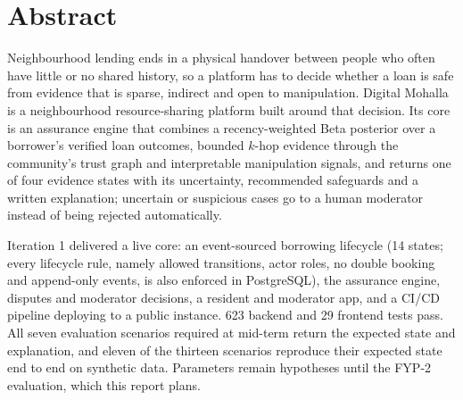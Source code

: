 \chapter*{Abstract}
Neighbourhood lending ends in a physical handover between people who often have little or no shared history, so a platform has to decide whether a loan is safe from evidence that is sparse, indirect and open to manipulation. Digital Mohalla is a neighbourhood resource-sharing platform built around that decision. Its core is an assurance engine that combines a recency-weighted Beta posterior over a borrower's verified loan outcomes, bounded $k$-hop evidence through the community's trust graph and interpretable manipulation signals, and returns one of four evidence states with its uncertainty, recommended safeguards and a written explanation; uncertain or suspicious cases go to a human moderator instead of being rejected automatically.

Iteration 1 delivered a live core: an event-sourced borrowing lifecycle (14 states; every lifecycle rule, namely allowed transitions, actor roles, no double booking and append-only events, is also enforced in PostgreSQL), the assurance engine, disputes and moderator decisions, a resident and moderator app, and a CI/CD pipeline deploying to a public instance. 623 backend and 29 frontend tests pass. All seven evaluation scenarios required at mid-term return the expected state and explanation, and eleven of the thirteen scenarios reproduce their expected state end to end on synthetic data. Parameters remain hypotheses until the FYP-2 evaluation, which this report plans.
